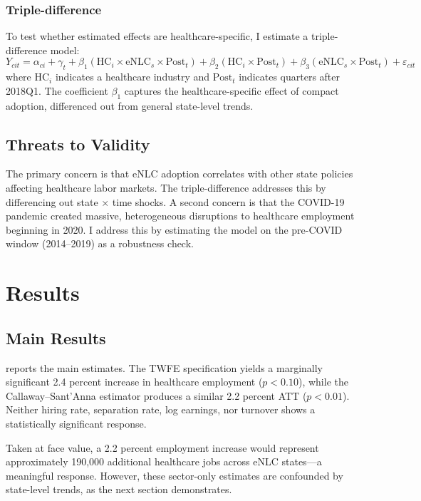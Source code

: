 \documentclass[12pt]{article}
\begin{document}
\subsubsection*{Triple-difference} To test whether estimated effects are healthcare-specific, I estimate a triple-difference model:
\begin{equation}
Y_{cit} = \alpha_{ci} + \gamma_t + \beta_1 (\text{HC}_i \times \text{eNLC}_s \times \text{Post}_t) + \beta_2 (\text{HC}_i \times \text{Post}_t) + \beta_3 (\text{eNLC}_s \times \text{Post}_t) + \varepsilon_{cit}
\label{eq:triple}
\end{equation}
where $\text{HC}_i$ indicates a healthcare industry and $\text{Post}_t$ indicates quarters after 2018Q1. The coefficient $\beta_1$ captures the healthcare-specific effect of compact adoption, differenced out from general state-level trends.

\subsection{Threats to Validity}

The primary concern is that eNLC adoption correlates with other state policies affecting healthcare labor markets. The triple-difference addresses this by differencing out state $\times$ time shocks. A second concern is that the COVID-19 pandemic created massive, heterogeneous disruptions to healthcare employment beginning in 2020. I address this by estimating the model on the pre-COVID window (2014--2019) as a robustness check.


\section{Results}

\subsection{Main Results}



 reports the main estimates. The TWFE specification yields a marginally significant 2.4 percent increase in healthcare employment ($p < 0.10$), while the Callaway--Sant'Anna estimator produces a similar 2.2 percent ATT ($p < 0.01$). Neither hiring rate, separation rate, log earnings, nor turnover shows a statistically significant response.

Taken at face value, a 2.2 percent employment increase would represent approximately 190,000 additional healthcare jobs across eNLC states---a meaningful response. However, these sector-only estimates are confounded by state-level trends, as the next section demonstrates.
\end{document}
